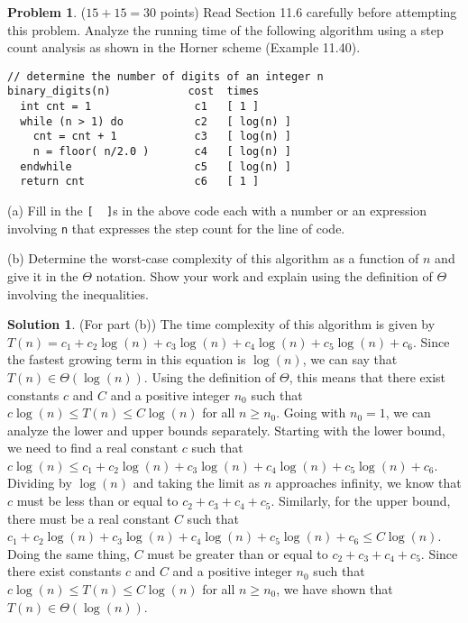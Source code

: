 \documentclass{article}
\theoremstyle{definition}
\newtheorem{problem}{Problem}
\newtheorem*{solution}{Solution}
\begin{document}
\newpage
\begin{problem} ($15+15=30$ points) Read Section 11.6 carefully before attempting this problem.
Analyze the running time of the following algorithm using a step count analysis 
as shown in the Horner scheme (Example 11.40).
\begin{verbatim}
// determine the number of digits of an integer n
binary_digits(n)            cost  times
  int cnt = 1                c1   [ 1 ]
  while (n > 1) do           c2   [ log(n) ]
    cnt = cnt + 1            c3   [ log(n) ]
    n = floor( n/2.0 )       c4   [ log(n) ]
  endwhile                   c5   [ log(n) ]
  return cnt                 c6   [ 1 ]
\end{verbatim}
\noindent
(a) Fill in the \verb|[  ]|s in the above code each with a number or an expression involving
\verb|n| that expresses the step count for the line of code.

\medskip
\noindent
(b) Determine the worst-case complexity of this algorithm as a function of $n$
and give it in the $\Theta$ notation.
Show your work and explain using the definition of $\Theta$ involving the inequalities. 
\end{problem}
\begin{solution} (For part (b))
The time complexity of this algorithm is given by $T(n) = c_1 + c_2\log(n) + c_3\log(n) + c_4\log(n) + c_5\log(n) + c_6$.
Since the fastest growing term in this equation is $\log(n)$, we can say that $T(n) \in \Theta(\log(n))$.
Using the definition of $\Theta$, this means that there exist constants $c$ and $C$ and a positive integer $n_0$
such that $c\log(n) \leq T(n) \leq C\log(n)$ for all $n \geq n_0$.
Going with $n_0 = 1$, we can analyze the lower and upper bounds separately.
Starting with the lower bound, we need to find a real constant $c$ such that $c\log(n) \leq c_1 + c_2\log(n) + c_3\log(n) + c_4\log(n) + c_5\log(n) + c_6$.
Dividing by $\log(n)$ and taking the limit as $n$ approaches infinity, we know that $c$ must be less than or equal to $c_2 + c_3 + c_4 + c_5$.
Similarly, for the upper bound, there must be a real constant $C$ such that $c_1 + c_2\log(n) + c_3\log(n) + c_4\log(n) + c_5\log(n) + c_6 \leq C\log(n)$.
Doing the same thing, $C$ must be greater than or equal to $c_2 + c_3 + c_4 + c_5$.
Since there exist constants $c$ and $C$ and a positive integer $n_0$ such that $c\log(n) \leq T(n) \leq C\log(n)$ for all $n \geq n_0$,
we have shown that $T(n) \in \Theta(\log(n))$.
\end{solution}
\end{document}
